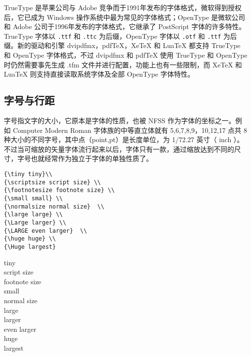 {\qquad TrueType 是苹果公司与 Adobe 竞争而于1991年发布的字体格式，微软得到授权后，它已成为 Windows 操作系统中最为常见的字体格式；OpenType 是微软公司和 Adobe 公司于1996年发布的字体格式，它继承了 PostScript 字体的许多特性。TrueType 字体以 \lstinline{.ttf} 和 \lstinline{.ttc} 为后缀，OpenType 字体以 \lstinline{.otf} 和 \lstinline{.ttf} 为后缀。新的驱动和引擎 dvipdfmx，pdfTeX，XeTeX 和 LuaTeX 都支持 TrueType 和 OpenType 字体格式，不过 dvipdfmx 和 pdfTeX 使用 TrueType
和 OpenType 时仍然需要事先生成 .tfm 文件并进行配置，功能上也有一些限制，而 XeTeX 和 LuaTeX 则支持直接读取系统字体及全部 OpenType 字体特性。
}

\subsection{字号与行距}

字号指文字的大小，它原本是字体的性质，也被 NFSS 作为字体的坐标之一。例如 Computer Modern Roman 字体族的中等直立体就有 5,6,7,8,9，10,12,17 点共 8 种大小的不同字号，其中点（point,pt）是长度单位，为 1/72.27 英寸（ inch ）。不过当可缩放的矢量字体流行起来以后，字体只有一款，通过缩放达到不同的尺寸，字号也就经常作为独立于字体的单独性质了。

\begin{minipage}[t]{0.45\textwidth}
\begin{lstlisting}
{\tiny tiny}\\
{\scriptsize script size} \\ 
{\footnotesize footnote size} \\ 
{\small small} \\ 
{\normalsize normal size}  \\  
{\large large} \\ 
{\Large larger} \\  
{\LARGE even larger}  \\ 
{\huge huge} \\ 
{\Huge largest}
\end{lstlisting}
\end{minipage}
\hfill
\begin{minipage}[t]{0.45\textwidth}
    {\tiny tiny}\\
    {\scriptsize script size} \\ 
    {\footnotesize footnote size} \\ 
    {\small small} \\ 
    {\normalsize normal size}  \\  
    {\large large} \\ 
    {\Large larger} \\  
    {\LARGE even larger}  \\ 
    {\huge huge} \\ 
    {\Huge largest}
\end{minipage}

